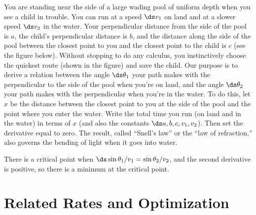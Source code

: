 \begin{exercises}
\begin{exercise}
You are standing near the side of a large wading pool of uniform depth when
you see a child in trouble.  You can run at a speed $\ds v_1$ on land and at a
slower speed $\ds v_2$ in the water.  Your perpendicular distance from the side
of the pool is $a$, the child's perpendicular distance is $b$, and the
distance along the side of the pool between the closest point to you and
the closest point to the child is $c$ (see the figure below). 
Without stopping to do any calculus, you instinctively choose the
quickest route (shown in the figure) and save the child.  Our
purpose is to derive a relation between the angle $\ds \theta_1$ your path
makes with the perpendicular to the side of the pool when you're on land,
and the angle $\ds \theta_2$ your path makes with the perpendicular when you're
in the water.  To do this, let $x$ be the distance between the closest
point to you at the side of the pool and the point where you enter the
water.  Write the total time you run (on land and in the water) in 
terms of $x$ (and also the constants $\ds a,b,c,v_1,v_2$).  Then set the
derivative equal to zero.  The result, called ``Snell's law'' or the ``law
of refraction,'' also governs the bending of light when it goes into water.
\begin{answer} There is a critical point when
$\ds \sin\theta_1/v_1=\sin\theta_2/v_2$, and the second derivative is
positive, so there is a minimum at the critical point.
\end{answer}\end{exercise}


\end{exercises}













\section{Related Rates and Optimization}

